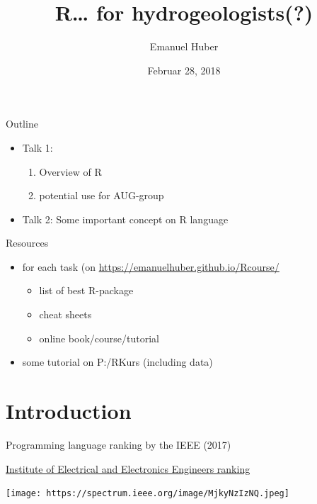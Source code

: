 \documentclass[8pt,ignorenonframetext,]{beamer}
\title{R\ldots{} for hydrogeologists(?)}
\author{Emanuel Huber}
\date{Februar 28, 2018}
\providecommand{\tightlist}{%
  \setlength{\itemsep}{0pt}\setlength{\parskip}{0pt}}
\begin{document}
\frame{\titlepage}

\begin{frame}

\end{frame}

\begin{frame}{Outline}

\begin{itemize}
\tightlist
\item
  Talk 1:

  \begin{enumerate}
  \def\labelenumi{\arabic{enumi}.}
  \tightlist
  \item
    Overview of R
  \item
    potential use for AUG-group
  \end{enumerate}
\item
  Talk 2: Some important concept on R language
\end{itemize}

\begin{block}{Resources}

\begin{itemize}
\tightlist
\item
  for each task (on \url{https://emanuelhuber.github.io/Rcourse/}

  \begin{itemize}
  \tightlist
  \item
    list of best R-package
  \item
    cheat sheets
  \item
    online book/course/tutorial
  \end{itemize}
\item
  some tutorial on P:/RKurs (including data)
\end{itemize}

\end{block}

\end{frame}

\section{Introduction}\label{introduction}

\begin{frame}{Programming language ranking by the IEEE (2017)}

\href{https://spectrum.ieee.org/computing/software/the-2017-top-programming-languages}{Institute
of Electrical and Electronics Engineers ranking}

\texttt{[image: https://spectrum.ieee.org/image/MjkyNzIzNQ.jpeg]}

\end{frame}
\end{document}
